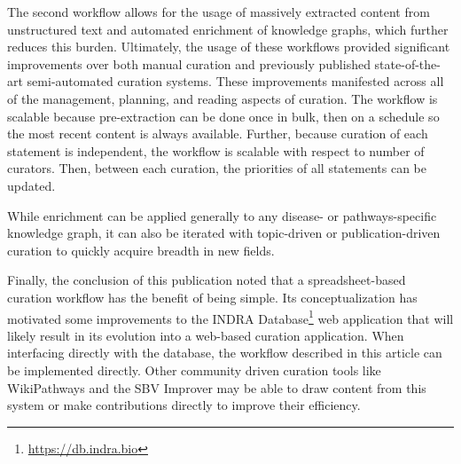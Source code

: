 The second workflow allows for the usage of massively extracted content from unstructured text and automated enrichment of knowledge graphs, which further reduces this burden.
Ultimately, the usage of these workflows provided significant improvements over both manual curation and previously published state-of-the-art semi-automated curation systems.
These improvements manifested across all of the management, planning, and reading aspects of curation.
The workflow is scalable because pre-extraction can be done once in bulk, then on a schedule so the most recent content is always available.
Further, because curation of each statement is independent, the workflow is scalable with respect to number of curators.
Then, between each curation, the priorities of all statements can be updated.

While enrichment can be applied generally to any disease- or pathways-specific knowledge graph, it can also be iterated with topic-driven or publication-driven curation to quickly acquire breadth in new fields.

Finally, the conclusion of this publication noted that a spreadsheet-based curation workflow has the benefit of being simple.
Its conceptualization has motivated some improvements to the INDRA Database\footnote{\url{https://db.indra.bio}} web application that will likely result in its evolution into a web-based curation application.
When interfacing directly with the database, the workflow described in this article can be implemented directly.
Other community driven curation tools like WikiPathways and the SBV Improver may be able to draw content from this system or make contributions directly to improve their efficiency.
